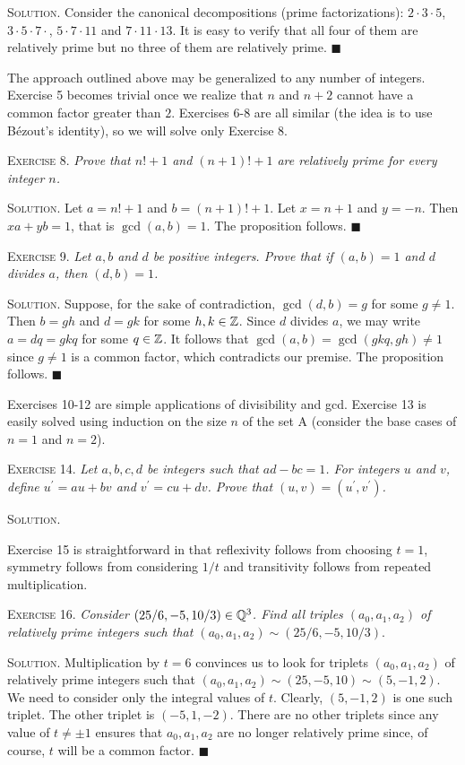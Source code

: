 \documentclass[11pt, leqno]{article}
\newcommand{\done}{\ensuremath{\blacksquare}}
\begin{document}
\textsc{Solution}. Consider the canonical decompositions (prime factorizations): $2\cdot3\cdot5$,  $3\cdot5\cdot7\cdot$, $5\cdot7\cdot11$ and $7\cdot11\cdot13$. It is easy to verify that all four of them are relatively prime but no three of them are relatively prime. \done

The approach outlined above may be generalized to any number of integers. Exercise 5 becomes trivial once we realize that $n$ and $n+2$ cannot have a common factor greater than $2$. Exercises 6-8 are all similar (the idea is to use B\'ezout's identity), so we will solve only Exercise 8.

\textsc{Exercise 8}. \emph{Prove that $n!+1$ and $(n+1)!+1$ are relatively prime for every integer $n$.}

\textsc{Solution}. Let $a = n!+1$ and $b = (n+1)!+1$. Let $x = n+1$ and $y = -n$. Then $xa + yb = 1$, that is $\gcd(a,b)=1$. The proposition follows. \done

\textsc{Exercise 9}. \emph{Let $a,b$ and $d$ be positive integers. Prove that if $(a,b)=1$ and $d$ divides $a$, then $(d,b)=1$.}

\textsc{Solution}. Suppose, for the sake of contradiction, $\gcd(d,b) = g$ for some $g\ne 1$. Then $b=gh$ and $d=gk$ for some $h,k \in \mathbb{Z}$. Since $d$ divides $a$, we may write $a = dq = gkq$ for some $q\in\mathbb{Z}$. It follows that $\gcd(a,b) = \gcd(gkq, gh) \ne 1$ since $g\ne 1$ is a common factor, which contradicts our premise. The proposition follows. \done

Exercises 10-12 are simple applications of divisibility and gcd. Exercise 13 is easily solved using induction on the size $n$ of the set A (consider the base cases of $n=1$ and $n=2$).

\textsc{Exercise 14}. \emph{Let $a,b,c,d$ be integers such that $ad-bc=1$. For integers $u$ and $v$, define $u^{\prime}=au+bv$ and $v^{\prime}=cu+dv$. Prove that $(u,v)=(u^{\prime},v^{\prime})$.}

\textsc{Solution}.

Exercise 15 is straightforward in that reflexivity follows from choosing $t=1$, symmetry follows from considering $1/t$ and transitivity follows from repeated multiplication.

\textsc{Exercise 16}. \emph{Consider $(25/6, -5, 10/3) \in \mathbb{Q}^3$. Find all triples $(a_0,a_1,a_2)$ of relatively prime integers such that $(a_0,a_1,a_2)\sim (25/6, -5, 10/3)$}.

\textsc{Solution}. Multiplication by $t=6$ convinces us to look for triplets $(a_0,a_1,a_2)$ of relatively prime integers such that $(a_0,a_1,a_2)\sim (25, -5, 10)\sim (5, -1, 2)$. We need to consider only the integral values of $t$. Clearly, $(5, -1, 2)$ is one such triplet. The other triplet is $(-5, 1, -2)$. There are no other triplets since any value of $t\ne \pm 1$ ensures that $a_0,a_1,a_2$ are no longer relatively prime since, of course, $t$ will be a common factor. \done
\end{document}
